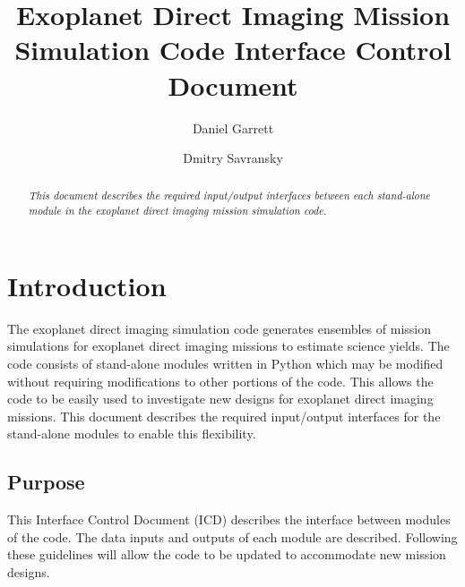 \documentclass[]{asme2ej}
\title{Exoplanet Direct Imaging Mission Simulation Code Interface Control Document}
\author{Daniel Garrett
    \affiliation{
	Graduate Research Assistant\\
	Cornell University\\
	Ithaca, NY 14850\\
    }	
}
\author{Dmitry Savransky
    \affiliation{ Professor\\
	Cornell University\\
	Ithaca, NY 14850
    }
}
\begin{document}
\maketitle    

\begin{abstract}
{\it 
This document describes the required input/output interfaces between each stand-alone module in the exoplanet direct imaging mission simulation code.
}
\end{abstract}

\tableofcontents

\begin{nomenclature}
\end{nomenclature}


\section{Introduction}

The exoplanet direct imaging simulation code generates ensembles of mission simulations for exoplanet direct imaging missions to estimate science yields. The code consists of stand-alone modules written in Python which may be modified without requiring modifications to other portions of the code. This allows the code to be easily used to investigate new designs for exoplanet direct imaging missions. This document describes the required input/output interfaces for the stand-alone modules to enable this flexibility.

\subsection{Purpose}
This Interface Control Document (ICD) describes the interface between modules of the code. The data inputs and outputs of each module are described. Following these guidelines will allow the code to be updated to accommodate new mission designs.
\end{document}
